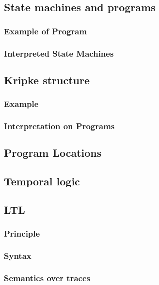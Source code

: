 \documentclass[12pt, a4paper]{book}
\begin{document}
  \subsection{State machines and programs}
  \label{sub:State machines and programs}
  \subsubsection{Example of Program}
  \label{subs:Example of Program}
  \subsubsection{Interpreted State Machines}
  \label{subs:Interpreted State Machines}
  \subsection{Kripke structure}
  \label{sub:Kripke structure}
  \subsubsection{Example}
  \label{subs:Example}
  \subsubsection{Interpretation on Programs}
  \label{subs:Interpretation on Programs}
  \subsection{Program Locations}
  \label{sub:Program Locations}
  \subsection{Temporal logic}
  \label{sub:Temporal logic}
  \subsection{LTL}
  \label{sub:LTL}
  \subsubsection{Principle}
  \label{subs:Principle}
  \subsubsection{Syntax}
  \label{subs:Syntax}
  \subsubsection{Semantics over traces}
  \label{subs:Semantics over traces}
\end{document}

